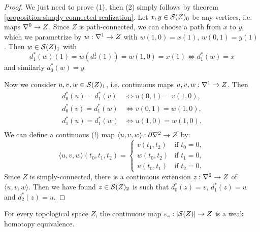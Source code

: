 \begin{proof}
We just need to prove (1), then (2) simply follows by
theorem \ref{proposition:simply-connected-realization}. Let $x,y\in\S(Z)_0$ be any vertices, i.e. maps $\sx{0}\to Z$. Since $Z$ is path-connected, we can choose a path from $x$ to $y$, which we parametrize by $w:\sx{1}\to Z$ with $w(1,0)=x(1)$, $w(0,1)=y(1)$. Then $w\in\S(Z)_1$ with
\[d_1^*(w)(1)=w(d_*^1(1))=w(1,0)=x(1)\iff d_1^*(w)=x\]
and similarly $d_0^*(w)=y$.

Now we consider $u,v,w\in\S(Z)_1$, i.e. continuous maps $u,v,w:\sx{1}\to Z$. Then
\begin{align*}
    d_0^*(u)=d_1^*(v) &\iff u(0,1)=v(1,0),\\
    d_0^*(v)=d_1^*(w) &\iff v(0,1)=w(1,0),\\
    d_1^*(u)=d_1^*(w) &\iff u(1,0)=w(1,0).\\
\end{align*}
We can define a continuous (!) map $\langle u,v,w\rangle:\de\sx{2}\to Z$ by:
\[\langle u,v,w\rangle(t_0,t_1,t_2)=\begin{cases}
v(t_1,t_2) & \text{if }t_0=0,\\
w(t_0,t_2) & \text{if }t_1=0,\\
u(t_0,t_1) & \text{if }t_2=0.
\end{cases}\]
Since $Z$ is simply-connected, there is a continuous extension $z:\sx{2}\to Z$ of $\langle u,v,w\rangle$. Then we have found $z\in\S(Z)_2$ is such that $d_0^*(z)=v$, $d_1^*(z)=w$ and $d_2^*(z)=u$.
\end{proof}

\begin{theorem}\label{theorem:adjunction-counit-is-a-weak-equivalence}
For every topological space $Z$, the continuous map $\epsilon_z:|\S(Z)|\to Z$ is a weak homotopy equivalence.
\end{theorem}

